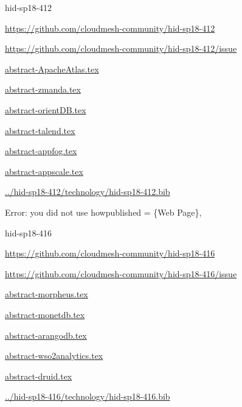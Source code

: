 \begin{IU}

hid-sp18-412

\url{https://github.com/cloudmesh-community/hid-sp18-412}

\url{https://github.com/cloudmesh-community/hid-sp18-412/issue}

\href{https://github.com/cloudmesh-community/hid-sp18-412/blob/master//technology/abstract-ApacheAtlas.tex}{abstract-ApacheAtlas.tex}

\href{https://github.com/cloudmesh-community/hid-sp18-412/blob/master//technology/abstract-zmanda.tex}{abstract-zmanda.tex}

\href{https://github.com/cloudmesh-community/hid-sp18-412/blob/master//technology/abstract-orientDB.tex}{abstract-orientDB.tex}

\href{https://github.com/cloudmesh-community/hid-sp18-412/blob/master//technology/abstract-talend.tex}{abstract-talend.tex}

\href{https://github.com/cloudmesh-community/hid-sp18-412/blob/master//technology/abstract-appfog.tex}{abstract-appfog.tex}

\href{https://github.com/cloudmesh-community/hid-sp18-412/blob/master//technology/abstract-appscale.tex}{abstract-appscale.tex}

\href{https://github.com/cloudmesh-community/hid-sp18-412/blob/master//technology/hid-sp18-412.bib}{../hid-sp18-412/technology/hid-sp18-412.bib}

Error: you did not use howpublished = \{Web Page\},

\end{IU}


\begin{IU}

hid-sp18-416

\url{https://github.com/cloudmesh-community/hid-sp18-416}

\url{https://github.com/cloudmesh-community/hid-sp18-416/issue}

\href{https://github.com/cloudmesh-community/hid-sp18-416/blob/master//technology/abstract-morpheus.tex}{abstract-morpheus.tex}

\href{https://github.com/cloudmesh-community/hid-sp18-416/blob/master//technology/abstract-monetdb.tex}{abstract-monetdb.tex}

\href{https://github.com/cloudmesh-community/hid-sp18-416/blob/master//technology/abstract-arangodb.tex}{abstract-arangodb.tex}

\href{https://github.com/cloudmesh-community/hid-sp18-416/blob/master//technology/abstract-wso2analytics.tex}{abstract-wso2analytics.tex}

\href{https://github.com/cloudmesh-community/hid-sp18-416/blob/master//technology/abstract-druid.tex}{abstract-druid.tex}

\href{https://github.com/cloudmesh-community/hid-sp18-416/blob/master//technology/hid-sp18-416.bib}{../hid-sp18-416/technology/hid-sp18-416.bib}

\end{IU}


